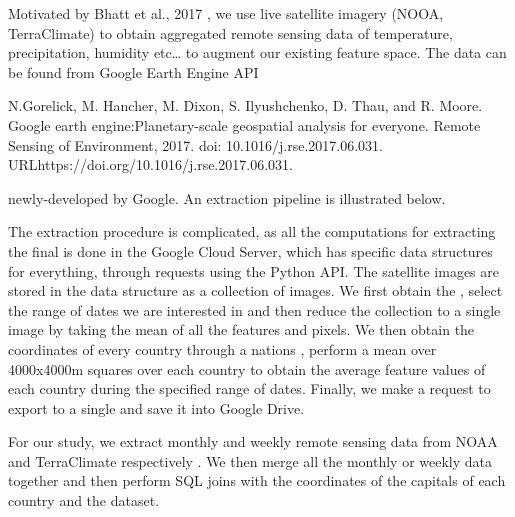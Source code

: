 \documentclass[letterpaper,10pt,english]{sphinxmanual}
\begin{document}
Motivated by Bhatt et al., 2017 \sphinxfootnotemark[10], we use live satellite imagery (NOOA, TerraClimate)
to obtain aggregated remote sensing data of temperature, precipitation,
humidity etc… to augment our existing feature space. The data can be found from
Google Earth Engine API %
\begin{footnote}[11]\sphinxAtStartFootnote
N.Gorelick, M. Hancher, M. Dixon, S. Ilyushchenko, D. Thau, and R. Moore.  Google earth engine:Planetary-scale geospatial analysis for everyone. Remote Sensing of Environment, 2017. doi: 10.1016/j.rse.2017.06.031. URLhttps://doi.org/10.1016/j.rse.2017.06.031.
%
\end{footnote} newly-developed by Google. An extraction pipeline is illustrated below.

\noindent{}

The extraction procedure is complicated, as all the computations for extracting the final  is done in the Google Cloud Server, which has specific data structures for everything, through requests using the Python API. The satellite images are stored in the  data structure as a collection of images. We first obtain the , select the range of dates we are interested in and then reduce the collection to a single image by taking the mean of all the features and pixels. We then obtain the coordinates of every country through a nations , perform a mean  over 4000x4000m squares over each country to obtain the average feature values of each country during the specified range of dates. Finally, we make a request to export to a single  and save it into Google Drive.

For our study, we extract monthly and weekly remote sensing data from NOAA and TerraClimate respectively \sphinxfootnotemark[11]. We then merge all the monthly or weekly data together and then perform SQL joins with the coordinates of the capitals of each country and the  dataset.
\end{document}
